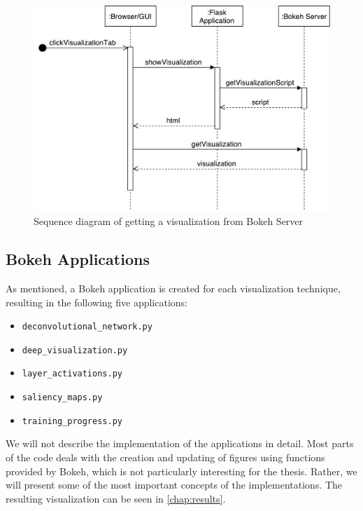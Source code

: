 \begin{figure}[h!]
    \centering
        \includegraphics[width=\textwidth]{fig/sequence-bokeh.pdf}
        \caption{Sequence diagram of getting a visualization from Bokeh Server}
        \label{fig:bokeh-server}
\end{figure}

\subsection{Bokeh Applications}

As mentioned, a Bokeh application is created for each visualization technique, resulting in the following five applications:

\begin{itemize}
    \item \texttt{deconvolutional\_network.py}
    \item \texttt{deep\_visualization.py}
    \item \texttt{layer\_activations.py}
    \item \texttt{saliency\_maps.py}
    \item \texttt{training\_progress.py}
\end{itemize}

\noindent We will not describe the implementation of the applications in detail. Most parts of the code deals with the creation and updating of figures using functions provided by Bokeh, which is not particularly interesting for the thesis. Rather, we will present some of the most important concepts of the implementations. The resulting visualization can be seen in \autoref{chap:results}.

